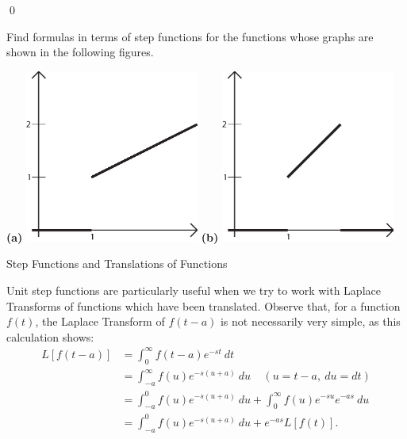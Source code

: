 {\qed

\begin{exe} Find formulas in terms of step functions for the functions whose graphs are shown in the following figures.  

\begin{center}
{\bf (a)} \includegraphics[width=2.25in]{11-laplaceII/stepfunction5.eps} \hspace{0.25in} {\bf (b)} \includegraphics[width=2.25in]{11-laplaceII/stepfunction5b.eps}
\end{center}
\end{exe}

\bigskip
\noindent
{\large {\sc Step Functions and Translations of Functions}}

\bigskip
Unit step functions are particularly useful when we try to work with Laplace Transforms of functions which have been translated.  Observe that, for a function $f(t)$, the Laplace Transform of $f(t-a)$ is not necessarily very simple, as this calculation shows:
\begin{align*}
L[f(t-a)] & = \int_0^\infty f(t-a)e^{-st} \ dt \\
& = \int_{-a}^\infty f(u) e^{-s(u+a)} \ du \ \ \ \ \ (u=t-a, \ du=dt) \\
& = \int_{-a}^0 f(u) e^{-s(u+a)} \ du + \int_0^\infty f(u)e^{-su}e^{-as} \ du \\
& = \int_{-a}^0 f(u) e^{-s(u+a)} \ du + e^{-as} L[f(t)].
\end{align*}

}
